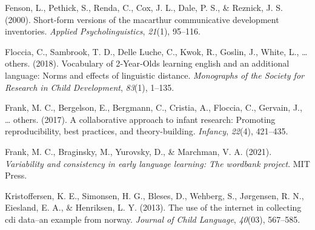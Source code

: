 \documentclass[
  english,
  ,man,floatsintext]{apa6}
\begin{document}
\leavevmode\hypertarget{ref-fenson2000b}{}%
Fenson, L., Pethick, S., Renda, C., Cox, J. L., Dale, P. S., \& Reznick, J. S. (2000). Short-form versions of the macarthur communicative development inventories. \emph{Applied Psycholinguistics}, \emph{21}(1), 95--116.

\leavevmode\hypertarget{ref-floccia2018}{}%
Floccia, C., Sambrook, T. D., Delle Luche, C., Kwok, R., Goslin, J., White, L., \ldots{} others. (2018). Vocabulary of 2‐Year‐Olds learning english and an additional language: Norms and effects of linguistic distance. \emph{Monographs of the Society for Research in Child Development}, \emph{83}(1), 1--135.

\leavevmode\hypertarget{ref-frank2017}{}%
Frank, M. C., Bergelson, E., Bergmann, C., Cristia, A., Floccia, C., Gervain, J., \ldots{} others. (2017). A collaborative approach to infant research: Promoting reproducibility, best practices, and theory-building. \emph{Infancy}, \emph{22}(4), 421--435.

\leavevmode\hypertarget{ref-Frank2021}{}%
Frank, M. C., Braginsky, M., Yurovsky, D., \& Marchman, V. A. (2021). \emph{Variability and consistency in early language learning: The wordbank project}. MIT Press.

\leavevmode\hypertarget{ref-kristoffersen2013}{}%
Kristoffersen, K. E., Simonsen, H. G., Bleses, D., Wehberg, S., Jørgensen, R. N., Eiesland, E. A., \& Henriksen, L. Y. (2013). The use of the internet in collecting cdi data--an example from norway. \emph{Journal of Child Language}, \emph{40}(03), 567--585.

\endgroup


\clearpage
\makeatletter
\efloat@restorefloats
\makeatother
\end{document}
